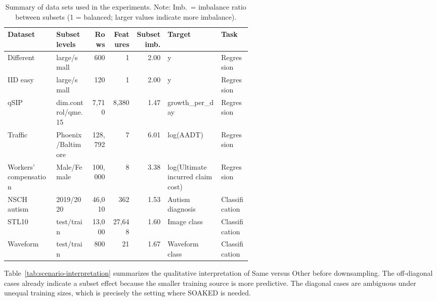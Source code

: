 \documentclass{article}
\begin{document}
\begin{table}[t]
\centering
\scriptsize
\setlength{\tabcolsep}{3pt}
\caption{Summary of data sets used in the experiments. Note: Imb.\ = imbalance ratio between subsets (1 = balanced; larger values indicate more imbalance).}
\label{tab:dataset-summary}
\begin{tabular}{p{0.20\linewidth}p{0.14\linewidth}rrrp{0.22\linewidth}l}
\toprule
\textbf{Dataset} & \textbf{Subset levels} & \textbf{Rows} & \textbf{Features} & \textbf{Subset imb.} & \textbf{Target} & \textbf{Task} \\
\midrule
Different & large/small & 600 & 1 & 2.00 & y & Regression \\
IID easy & large/small & 120 & 1 & 2.00 & y & Regression \\
qSIP & dim.control/qme.15 & 7,710 & 8,380 & 1.47 & growth\_per\_day & Regression \\
Traffic & Phoenix/Baltimore & 128,792 & 7 & 6.01 & log(AADT) & Regression \\
Workers' compensation & Male/Female & 100,000 & 8 & 3.38 & log(Ultimate incurred claim cost) & Regression \\
NSCH autism & 2019/2020 & 46,010 & 362 & 1.53 & Autism diagnosis & Classification \\
STL10 & test/train & 13,000 & 27,648 & 1.60 & Image class & Classification \\
Waveform & test/train & 800 & 21 & 1.67 & Waveform class & Classification \\
\bottomrule
\end{tabular}
\end{table}

Table~\ref{tab:scenario-interpretation} summarizes the qualitative interpretation of Same versus Other before downsampling.
The off-diagonal cases already indicate a subset effect because the smaller training source is more predictive.
The diagonal cases are ambiguous under unequal training sizes, which is precisely the setting where SOAKED is needed.
\end{document}
